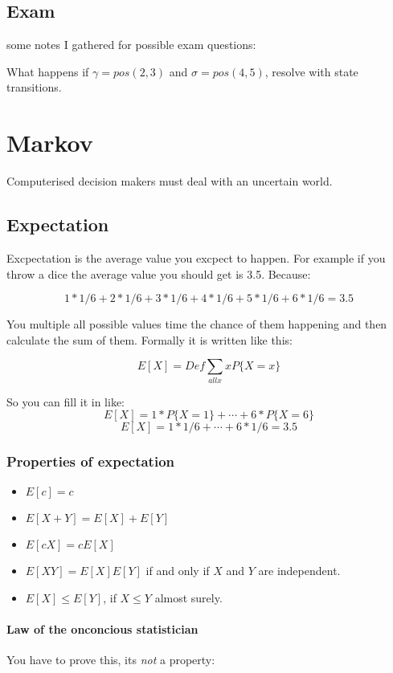 \documentclass{article}
\begin{document}
\subsection{Exam}
some notes I gathered for possible exam questions:

What happens if $\gamma = pos(2,3)$ and $\sigma = pos(4,5)$, resolve with
state transitions.

\section{Markov}
Computerised decision makers must deal with an uncertain world.

\subsection{Expectation}
Excpectation is the average value you excpect to happen. For example if you
throw a dice the average value you should get is 3.5. Because:

\[1 * 1/6 + 2 * 1/6 + 3 * 1/6 + 4 * 1/6 + 5 * 1/6 + 6 * 1/6 = 3.5\]

You multiple all possible values time the chance of them happening and then
calculate the sum of them. Formally it is written like this:

\[ E[X]=Def \sum_{all x} xP\{X=x\} \]

So you can fill it in like:
\[E[X]= 1 * P\{X=1\} + \cdots + 6 *P\{X=6\}\]
\[E[X]= 1 * 1/6 + \cdots + 6 *1/6 = 3.5\]

\subsubsection{Properties of expectation}

\begin{itemize}
	\item $E[c] = c$
	\item $E[X+Y] = E[X] + E[Y]$
	\item $E[cX] = cE[X]$
	\item $E[XY] = E[X]E[Y]$ if and only if $X$ and $Y$ are independent.
	\item $E[X] \le E[Y]$, if $X \le Y$ almost surely.
\end{itemize}

\paragraph{Law of the onconcious statistician}
You have to prove this, its \emph{not} a property:
\end{document}
